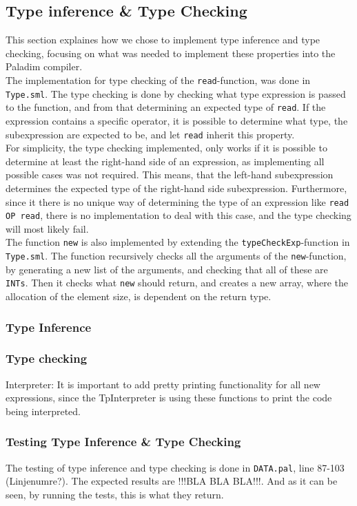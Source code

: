 \documentclass[10pt]{article}
\begin{document}
\subsection{Type inference \& Type Checking}
This section explaines how we chose to implement type inference and type checking, focusing on what was needed to implement these properties into the Paladim compiler.\\
The implementation for type checking of the \texttt{read}-function, was done in \texttt{Type.sml}. The type checking is done by checking what type expression is passed to the function, and from that determining an expected type of \texttt{read}. If the expression contains a specific operator, it is possible to determine what type, the subexpression are expected to be, and let \texttt{read} inherit this property.\\
For simplicity, the type checking implemented, only works if it is possible to determine at least the right-hand side of an expression, as implementing all possible cases was not required. This means, that the left-hand subexpression determines the expected type of the right-hand side subexpression. Furthermore, since it there is no unique way of determining the type of an expression like \texttt{read OP read}, there is no implementation to deal with this case, and the type checking will most likely fail.\\
The function \texttt{new} is also implemented by extending the \texttt{typeCheckExp}-function in \texttt{Type.sml}. The function recursively checks all the arguments of the \texttt{new}-function, by generating a new list of the arguments, and checking that all of these are \texttt{INTs}. Then it checks what \texttt{new} should return, and creates a new array, where the allocation of the element size, is dependent on the return type.
\subsubsection{Type Inference}
\subsubsection{Type checking}

Interpreter:
It is important to add pretty printing functionality for all new expressions, since the TpInterpreter is using these functions to print the code being interpreted.
\subsubsection{Testing Type Inference \& Type Checking}
The testing of type inference and type checking is done in \texttt{DATA\parterTest.pal}, line 87-103 (Linjenumre?). The expected results are !!!BLA BLA BLA!!!. And as it can be seen, by running the tests, this is what they return.
\end{document}
